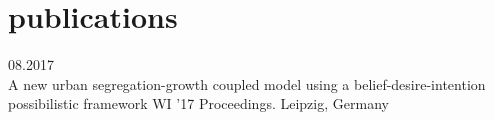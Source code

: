 \documentclass[english]{cv-style}          %
\begin{document}
\section{publications}

\begin{entrylist}
\entry
{08.2017\\\vspace{-0.3cm}}
{A new urban segregation-growth coupled model using a belief-desire-intention possibilistic framework}
{WI '17 Proceedings. Leipzig, Germany}
{\vspace{-0.3cm}}
\end{entrylist}
\end{document}
